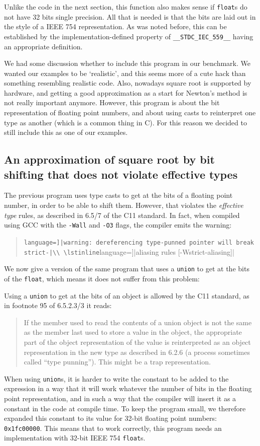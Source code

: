 \documentclass{article}
\begin{document}
Unlike the code in the next section, this function also makes sense if \lstinline|float|s
do not have 32 bits single precision.
All that is needed is that the bits are laid out in the style of a
IEEE 754 representation.
As was noted before, this can be established by the implementation-defined
property of \lstinline|__STDC_IEC_559__| having an appropriate definition.

We had some discussion whether to include this program in our benchmark.
We wanted our examples to be `realistic', and this seems more of
a cute hack than something resembling realistic code.
Also, nowadays square root is supported by hardware, and getting a good approximation
as a start for Newton's method is not really important anymore.
However, this program is about the bit representation of floating point
numbers, and about using casts to reinterpret one type as another (which is
a common thing in C).
For this reason we decided to still include this
as one of our examples.

\subsection{An approximation of square root by bit shifting that does not violate effective types}\label{sqrt3}
The previous program uses type casts to get at the bits of a floating point number,
in order to be able to shift them.
However, that violates the \emph{effective type} rules, as described
in 6.5/7 of the C11 standard.
In fact, when compiled using GCC with the \lstinline|-Wall| and \lstinline|-O3| flags,
the compiler emits the warning:
\begin{quote}
\lstinline[language=]|warning: dereferencing type-punned pointer will break strict-|\\
\lstinline[language=]|aliasing rules [-Wstrict-aliasing]|
\end{quote}
We now give a version of the same program that uses a \lstinline|union| to
get at the bits of the \lstinline|float|, which means it
does not suffer from this problem:

Using a \lstinline|union| to get at the bits of an object is allowed by the C11 standard, as in
footnote 95 of 6.5.2.3/3 it reads:
\begin{quote}
If the member used to read the contents of a union object is not the same as the member last used to
store a value in the object, the appropriate part of the object representation of the value is reinterpreted
as an object representation in the new type as described in 6.2.6 (a process sometimes called ``type
punning''). This might be a trap representation.
\end{quote}
When using \lstinline|union|s, it is harder to write the constant to be
added to the expression in a way that it will work whatever
the number of bits in the floating point representation, and
in such a way that the compiler will insert it as a constant in the code
at compile time.
To keep the program small, we therefore expanded this constant to its value for 32-bit
floating point numbers: \lstinline|0x1fc00000|. %
This means that to work correctly, this program needs an implementation with 32-bit IEEE 754 \lstinline|float|s.
\end{document}
